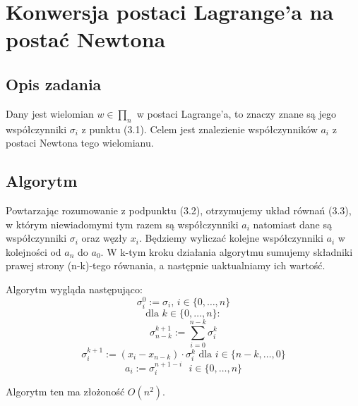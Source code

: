 \documentclass{article}
\begin{document}
\section{Konwersja postaci Lagrange'a na postać Newtona}

\subsection{Opis zadania}
Dany jest wielomian $w \in \prod _{n}$ w postaci Lagrange'a, to znaczy znane są jego współczynniki $\sigma_{i}$ z punktu (3.1). Celem jest znalezienie współczynników $a_{i}$ z postaci Newtona tego wielomianu. 

\subsection{Algorytm}

Powtarzając rozumowanie z podpunktu (3.2), otrzymujemy układ równań (3.3), w którym niewiadomymi tym razem są współczynniki $a_{i}$ natomiast dane są współczynniki $\sigma_{i}$ oraz węzły $x_{i}$. Będziemy wyliczać kolejne współczynniki $a_{i}$ w kolejności od $a_{n}$ do $a_{0}$. W k-tym kroku działania algorytmu sumujemy składniki prawej strony (n-k)-tego równania, a następnie uaktualniamy ich wartość. 

Algorytm wygląda następująco: 
$$ \sigma_{i}^{0} := \sigma_{i}\text{, } i \in \{0, \ldots, n\} $$
$$ $$ 
$$ \text{dla }  k \in \{0, \ldots, n \} : $$
$$ \sigma_{n-k}^{k+1} := \sum_{i=0}^{n-k}\sigma_{i}^{k} $$
$$ \sigma_{i}^{k+1} := (x_{i} - x_{n-k}) \cdot \sigma_{i}^{k} \text{ dla } i \in \{n-k, \ldots, 0\} $$
$$ $$ 
$$ a_{i} := \sigma_{i}^{n+1-i} \text{  } i\in \{0,\ldots,n\} $$ 

Algorytm ten ma złożoność $O(n^2)$.
\end{document}
